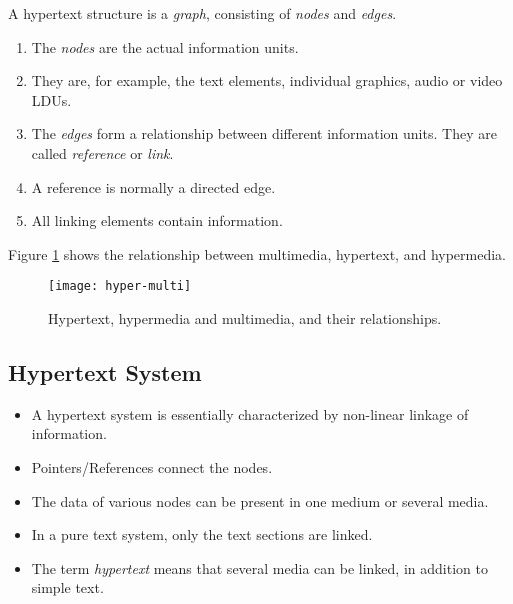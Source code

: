 A hypertext structure is a \textit{graph}, consisting of \textit{nodes} and \textit{edges}.
\begin{multicols}{2}
	\begin{enumerate}[label=(\alph*)]
		\item The \textit{nodes} are the actual information units. 
		\item They are, for example, the text elements, individual graphics, audio or video LDUs. 
		\item The \textit{edges} form a relationship between different information units. They are called \textit{reference} or \textit{link}. 
		\item A reference is normally a directed edge. 
		\item All linking elements contain information.
	\end{enumerate}
\end{multicols}

Figure {\ref{fig:hyper-multi}} shows the relationship between multimedia, hypertext, and hypermedia.

\begin{figure}[ht!]
	\centering
	\texttt{[image: hyper-multi]}
	\caption{Hypertext, hypermedia and multimedia, and their relationships.}{\label{fig:hyper-multi}}
\end{figure}


\subsection[Hypertext]{Hypertext System}
\begin{multicols}{2}
	\begin{itemize}
		\item A hypertext system is essentially characterized by non-linear linkage of information. 
		\item Pointers/References connect the nodes. 
		\item The data of various nodes can be present in one medium or several media. 
		\item In a pure text system, only the text sections are	linked. 
		\item The term \textit{hypertext} means that several media can be linked, in addition to simple	text.
	\end{itemize}
\end{multicols}


